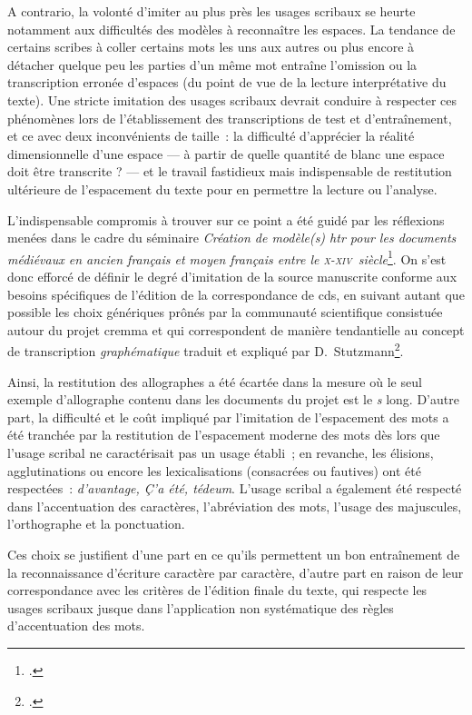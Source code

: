 \documentclass[a4paper,12pt,twoside]{book}
\newcommand{\siecle}[1]{\textsc{#1}\ieme}
\begin{document}
				A contrario, la volonté d'imiter au plus près les usages scribaux se heurte notamment aux difficultés des modèles à reconnaître les espaces. La tendance de certains scribes à coller certains mots les uns aux autres ou plus encore à détacher quelque peu les parties d'un même mot entraîne l'omission ou la transcription erronée d'espaces (du point de vue de la lecture interprétative du texte). Une stricte imitation des usages scribaux devrait conduire à respecter ces phénomènes lors de l'établissement des transcriptions de test et d'entraînement, et ce avec deux inconvénients de taille~: la difficulté d'apprécier la réalité dimensionnelle d'une espace --- à partir de quelle quantité de blanc une espace doit être transcrite ? --- et le travail fastidieux mais indispensable de restitution ultérieure de l'espacement du texte pour en permettre la lecture ou l'analyse.
				
				L'indispensable compromis à trouver sur ce point a été guidé par les réflexions menées dans le cadre du séminaire \textit{Création de modèle(s) \gls{htr} pour les documents médiévaux en ancien français et moyen français entre le \siecle{x}-\siecle{xiv}~siècle}\footcite{pincheSeminaireCreationModele2021b}. On s'est donc efforcé de définir le degré d'imitation de la source manuscrite conforme aux besoins spécifiques de l'édition de la correspondance de \gls{cds}, en suivant autant que possible les choix génériques prônés par la communauté scientifique consistuée autour du projet \gls{cremma} et qui correspondent de manière tendantielle au concept de transcription \textit{graphématique} traduit et expliqué par D.~Stutzmann\footcite[p.~251]{stutzmannPaleographieStatistiquePour2011}.
				
				Ainsi, la restitution des allographes a été écartée dans la mesure où le seul exemple d'allographe contenu dans les documents du projet est le \textit{s} long. D'autre part, la difficulté et le coût impliqué par l'imitation de l'espacement des mots a été tranchée par la restitution de l'espacement moderne des mots dès lors que l'usage scribal ne caractérisait pas un usage établi~; en revanche, les élisions, agglutinations ou encore les lexicalisations (consacrées ou fautives) ont été respectées~: \textit{d'avantage, Ç'a été, tédeum}. L'usage scribal a également été respecté dans l'accentuation des caractères, l'abréviation des mots, l'usage des majuscules, l'orthographe et la ponctuation.
				
				Ces choix se justifient d'une part en ce qu'ils permettent un bon entraînement de la reconnaissance d'écriture caractère par caractère, d'autre part en raison de leur correspondance avec les critères de l'édition finale du texte, qui respecte les usages scribaux jusque dans l'application non systématique des règles d'accentuation des mots.
				
\end{document}
